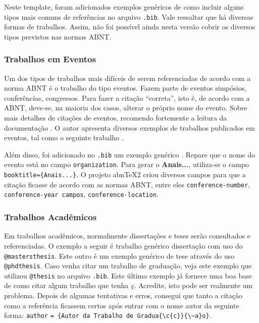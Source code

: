 \documentclass[
  12pt,		%
  a4paper,	%
  openright,%
  oneside,	%
  chapter=TITLE,		%
  section=TITLE,		%
  english,	%
  french,	%
  spanish,	%
  brazil
]{abntex2}
\begin{document}
            Neste template, foram adicionados exemplos genéricos de como incluir alguns tipos mais comuns de referências no arquivo \verb|.bib|. Vale ressaltar que há diversas formas de trabalhos. Assim, não foi possível ainda nesta versão cobrir os diversos tipos previstos nas normas ABNT.
        
         \subsubsection{Trabalhos em Eventos}
         
            Um dos tipos de trabalhos mais difíceis de serem referenciadas de acordo com a norma ABNT é o trabalho do tipo eventos. Fazem parte de eventos simpósios, conferências, congressos. Para fazer a citação ``correta'', isto é, de acordo com a ABNT, deve-se, na maioria dos casos, alterar o próprio nome do evento.  Sobre mais detalhes de citações de eventos, recomendo fortemente a leitura da documentação . O autor apresenta diversos exemplos de trabalhos publicados em eventos, tal como o seguinte trabalho \cite{martin1997}.
            
            Além disso, foi adicionado no \verb|.bib| um exemplo genérico   \cite{inproceedings}. Repare que o nome do evento está no campo \verb|organization|. Para gerar o \textbf{Anais...}, utiliza-se o campo \verb|booktitle={Anais...}|. O projeto abn\TeX2{} criou diversos campos para que a citação ficasse de acordo com as normas ABNT, entre eles \verb|conference-number|, \verb|conference-year campos|, \verb|conference-location|.
        
         \subsubsection{Trabalhos Acadêmicos}
            
            Em trabalhos acadêmicos, normalmente dissertações e teses serão consultados e referenciadas. O exemplo a seguir é trabalho genérico dissertação \cite{teseMestrado} com uso do \verb|@mastersthesis|. Este outro é um exemplo genérico de tese \cite{teseDoutorado} através do uso \verb|@phdthesis|. Caso venha citar um trabalho de graduação, veja este exemplo \cite{trabalhoGraduacao} que utilizou \verb|@thesis| no arquivo \verb|.bib|. Este último exemplo já fornece uma boa base de como citar algum trabalho que tenha \emph{ç}. Acredite, isto pode ser realmente um problema. Depois de algumas tentativas e erros, consegui que tanto a citação como a referência ficassem certos após entrar com o nome autor da seguinte forma: \verb|author| \verb|= {Autor da Trabalho de Gradua{\c{c}}{\~a}o}|.
            
\end{document}
